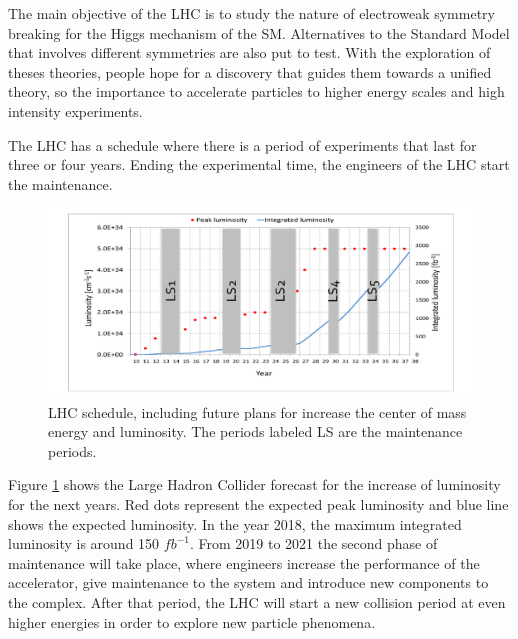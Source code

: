 The main objective of the LHC is to study the nature of electroweak symmetry breaking for the Higgs mechanism of the SM. 
Alternatives to the Standard Model that involves different symmetries are also put to test. With the exploration of theses theories, people hope for a discovery that guides them towards a unified theory, so the importance to accelerate particles to higher energy scales and high intensity experiments. 

The LHC has a schedule where there is a period of experiments that last for three or four years. Ending the experimental time, the engineers of the LHC start the maintenance.

\begin{figure}[ht]
\centering
\includegraphics[scale=0.5]{Chapter2/lum6.png}
\caption[LHC schedule]{LHC schedule, including future plans for increase the center of mass energy and luminosity. The periods labeled LS are the maintenance periods\cite{cern3}.}
\label{lhc-lumi}
\end{figure}
Figure \ref{lhc-lumi} shows the Large Hadron Collider forecast for the increase of luminosity for the next years. Red dots represent the expected peak luminosity and blue line shows the expected luminosity. In the year 2018, the maximum integrated luminosity is around 150 $fb^{-1}$\cite{cern3}. From 2019 to 2021 the second phase of maintenance will take place, where engineers increase the performance of the accelerator, give maintenance to the system and introduce new components to the complex. After that period, the LHC will start a new collision period at even higher energies in order to explore new particle phenomena.

\pagebreak

